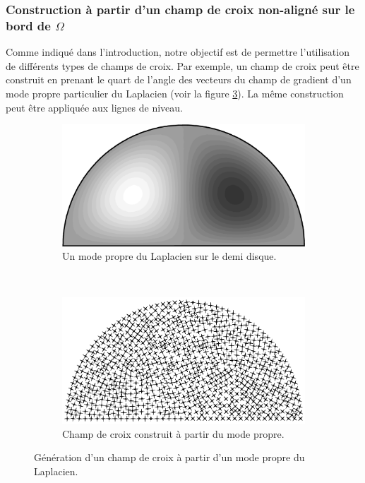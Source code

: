 \subsubsection*{Construction à partir d'un champ de croix non-aligné sur le bord de $\Omega$}

Comme indiqué dans l'introduction, notre objectif est de permettre l'utilisation de différents types de champs de croix. Par exemple, un champ de croix peut être construit en prenant le quart de l'angle des vecteurs du champ de gradient d'un mode propre particulier du Laplacien (voir la figure \ref{fig:demiDisc_valProp}). La même construction peut être appliquée aux lignes de niveau.

\begin{figure}[!h]
\centering
\begin{subfigure}{0.65\textwidth}
    \includegraphics[width=\textwidth]{images/demiDiscValProp.eps}
    \caption{Un mode propre du Laplacien sur le demi disque.}
    \label{fig:demiDiscValPropSheet_first}
\end{subfigure}
\\[3ex]
\begin{subfigure}{0.75\textwidth}
    \includegraphics[width=\textwidth]{images/demiDiscValPropSheet.eps}
    \caption{Champ de croix construit à partir du mode propre.}
    \label{fig:demiDiscValPropSheet_second}
\end{subfigure}

\caption{Génération d'un champ de croix à partir d'un mode propre du Laplacien.}
\label{fig:demiDisc_valProp}
\end{figure}

